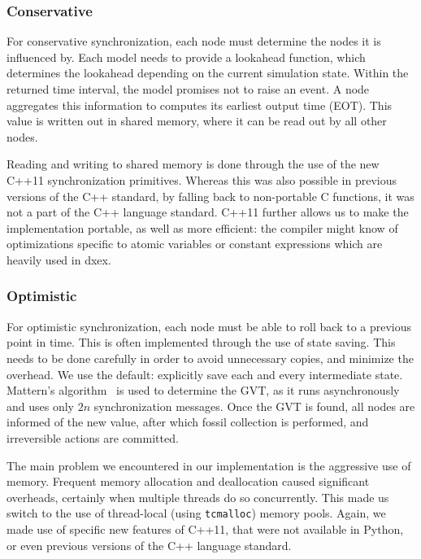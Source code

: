 \subsubsection{Conservative}
For conservative synchronization, each node must determine the nodes it is influenced by.
Each model needs to provide a lookahead function, which determines the lookahead depending on the current simulation state.
Within the returned time interval, the model promises not to raise an event.
A node aggregates this information to computes its earliest output time (EOT).
This value is written out in shared memory, where it can be read out by all other nodes.

Reading and writing to shared memory is done through the use of the new C++11 synchronization primitives.
Whereas this was also possible in previous versions of the C++ standard, by falling back to non-portable C functions, it was not a part of the C++ language standard.
C++11 further allows us to make the implementation portable, as well as more efficient: the compiler might know of optimizations specific to atomic variables or constant expressions which are heavily used in dxex.

\subsubsection{Optimistic}
For optimistic synchronization, each node must be able to roll back to a previous point in time.
This is often implemented through the use of state saving.
This needs to be done carefully in order to avoid unnecessary copies, and minimize the overhead.
We use the default: explicitly save each and every intermediate state.
Mattern's algorithm~\cite{mattern} is used to determine the GVT, as it runs asynchronously and uses only $2n$ synchronization messages.
Once the GVT is found, all nodes are informed of the new value, after which fossil collection is performed, and irreversible actions are committed.

The main problem we encountered in our implementation is the aggressive use of memory.
Frequent memory allocation and deallocation caused significant overheads, certainly when multiple threads do so concurrently.
This made us switch to the use of thread-local (using \texttt{tcmalloc}) memory pools.
Again, we made use of specific new features of C++11, that were not available in Python, or even previous versions of the C++ language standard.


